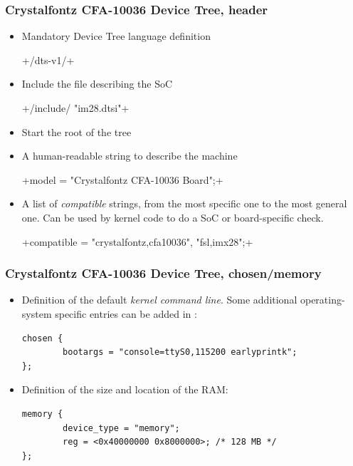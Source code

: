 \begin{frame}[fragile]
  \frametitle{Crystalfontz CFA-10036 Device Tree, header}
  \begin{itemize}
  \item Mandatory Device Tree language definition\\
    \begin{block}{} +/dts-v1/+ \end{block}
  \item Include the  file describing the SoC\\
    \begin{block}{}
      +/include/ "im28.dtsi"+
    \end{block}
  \item Start the root of the tree\\
    \begin{block}{} +/ {+ \end{block}
  \item A human-readable string to describe the machine\\
    \begin{block}{}
      +model = "Crystalfontz CFA-10036 Board";+
    \end{block}
  \item A list of {\em compatible} strings, from the most specific one
    to the most general one. Can be used by kernel code to do a SoC or
    board-specific check.\\
    \begin{block}{}
      +compatible = "crystalfontz,cfa10036", "fsl,imx28";+
    \end{block}
  \end{itemize}
\end{frame}

\begin{frame}[fragile]
  \frametitle{Crystalfontz CFA-10036 Device Tree, chosen/memory}
  \begin{itemize}
  \item Definition of the default {\em kernel command line}. Some
    additional operating-system specific entries can be added in
    :
    \begin{block}{}
    \begin{verbatim}
chosen {
        bootargs = "console=ttyS0,115200 earlyprintk";
};
\end{verbatim}
\end{block}
\item Definition of the size and location of the RAM:
  \begin{block}{}
    \begin{verbatim}
memory {
        device_type = "memory";
        reg = <0x40000000 0x8000000>; /* 128 MB */
};
      \end{verbatim}
    \end{block}
  \end{itemize}
\end{frame}

